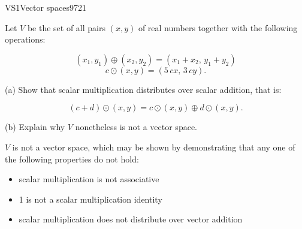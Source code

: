 \begin{exercise}{VS1}{Vector spaces}{9721} 
\begin{exerciseStatement} 

 Let \(V\) be the set of all pairs \((x,y)\) of real numbers together with the following operations: 

 \[(x_1,y_1)\oplus (x_2,y_2)=\left(x_{1} + x_{2},\,y_{1} + y_{2}\right)\]\[c \odot (x,y) =\left(5 \, c x,\,3 \, c y\right).\] 

 (a) Show that scalar multiplication distributes over scalar addition, that is: 

 \[
      (c+d)\odot(x,y)=c\odot(x,y)\oplus d\odot (x,y).
    \] 

 (b) Explain why \(V\) nonetheless is not a vector space. 

 \end{exerciseStatement}
 \begin{exerciseAnswer} 

 \(V\) is not a vector space, which may be shown by demonstrating that any one of the following properties do not hold: 

 

\begin{itemize}
\item scalar multiplication is not associative
\item 1 is not a scalar multiplication identity
\item scalar multiplication does not distribute over vector addition
\end{itemize}

     \end{exerciseAnswer}
 \end{exercise}


